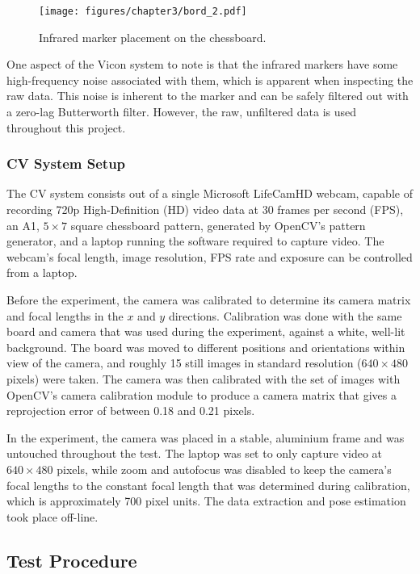 \begin{figure}
   \centering 
   \texttt{[image: figures/chapter3/bord\_2.pdf]}
   \caption{Infrared marker placement on the chessboard.}
\label{fig:board-marker-placement}
\end{figure}

One aspect of the Vicon system to note is that the infrared markers have some high-frequency noise associated with them, which is apparent when inspecting the raw data. This noise is inherent to the marker and can be safely filtered out with a zero-lag Butterworth filter. However, the raw, unfiltered data is used throughout this project. 

\subsubsection{CV System Setup}

The CV system consists out of a single Microsoft LifeCamHD webcam, capable of recording 720p High-Definition (HD) video data at 30 frames per second (FPS), an A1, $5\times7$ square chessboard pattern, generated by OpenCV's pattern generator, and a laptop running the software required to capture video. The webcam's focal length, image resolution, FPS rate and exposure can be controlled from a laptop. 

Before the experiment, the camera was calibrated to determine its camera matrix and focal lengths in the $x$ and $y$ directions. Calibration was done with the same board and camera that was used during the experiment, against a white, well-lit background. The board was moved to different positions and orientations within view of the camera, and roughly 15 still images in  standard resolution ($640\times480$ pixels) were taken. The camera was then calibrated with the set of images with OpenCV's camera calibration module to produce a camera matrix that gives a reprojection error of between 0.18 and 0.21 pixels. 

In the experiment, the camera was placed in a stable, aluminium frame and was untouched throughout the test. The laptop was set to only capture video at $640\times480$ pixels, while zoom and autofocus was disabled to keep the camera's focal lengths to the constant focal length that was determined during calibration, which is approximately 700 pixel units. The data extraction and pose estimation took place off-line. 

\subsection{Test Procedure}

